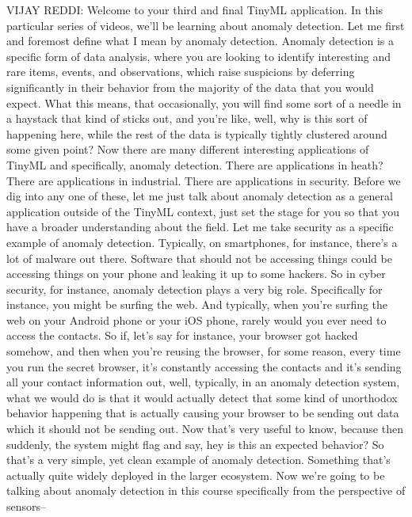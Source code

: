   VIJAY REDDI: Welcome to your third and final TinyML application.
  In this particular series of videos, we'll
  be learning about anomaly detection.
  Let me first and foremost define what I mean by anomaly detection.
  Anomaly detection is a specific form of data analysis, where
  you are looking to identify interesting and rare items, events,
  and observations, which raise suspicions by deferring significantly
  in their behavior from the majority of the data that you would expect.
  What this means, that occasionally, you will find some sort of a needle
  in a haystack that kind of sticks out, and you're like, well,
  why is this sort of happening here, while the rest of the data
  is typically tightly clustered around some given point?
  Now there are many different interesting applications of TinyML
  and specifically, anomaly detection.
  There are applications in heath?
  There are applications in industrial.
  There are applications in security.
  Before we dig into any one of these, let me just talk about anomaly detection
  as a general application outside of the TinyML context,
  just set the stage for you so that you have a broader
  understanding about the field.
  Let me take security as a specific example of anomaly detection.
  Typically, on smartphones, for instance, there's a lot of malware out there.
  Software that should not be accessing things
  could be accessing things on your phone and leaking it up to some hackers.
  So in cyber security, for instance, anomaly detection
  plays a very big role.
  Specifically for instance, you might be surfing the web.
  And typically, when you're surfing the web on your Android phone or your iOS
  phone, rarely would you ever need to access the contacts.
  So if, let's say for instance, your browser got hacked somehow,
  and then when you're reusing the browser, for some reason,
  every time you run the secret browser, it's constantly accessing the contacts
  and it's sending all your contact information out, well, typically,
  in an anomaly detection system, what we would
  do is that it would actually detect that some kind of unorthodox behavior
  happening that is actually causing your browser to be sending out
  data which it should not be sending
  out.
  Now that's very useful to know, because then suddenly, the system
  might flag and say, hey is this an expected behavior?
  So that's a very simple, yet clean example of anomaly detection.
  Something that's actually quite widely deployed in the larger ecosystem.
  Now we're going to be talking about anomaly detection in this course
  specifically from the perspective of sensors--

